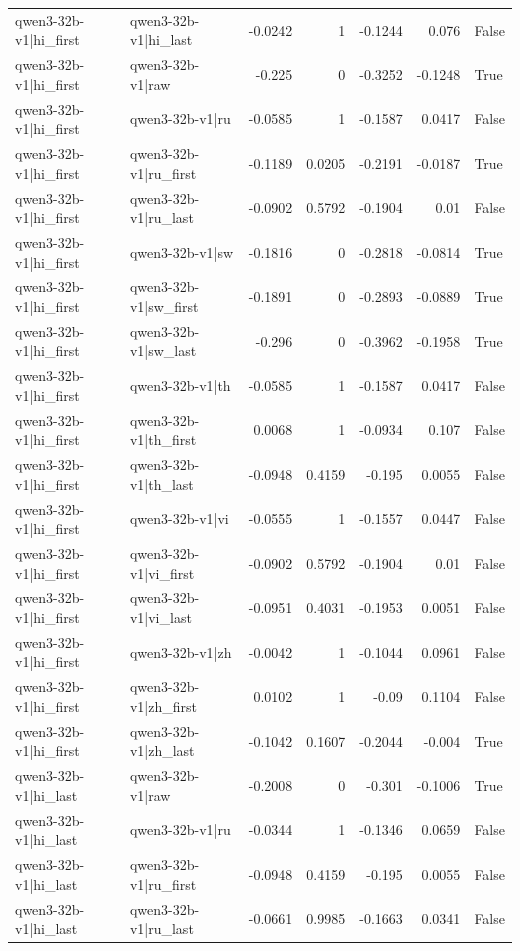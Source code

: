 \begin{table}
\begin{tabular}{l l r r r r l}
qwen3-32b-v1|hi_first & qwen3-32b-v1|hi_last & -0.0242 & 1 & -0.1244 & 0.076 & False \\
qwen3-32b-v1|hi_first & qwen3-32b-v1|raw & -0.225 & 0 & -0.3252 & -0.1248 & True \\
qwen3-32b-v1|hi_first & qwen3-32b-v1|ru & -0.0585 & 1 & -0.1587 & 0.0417 & False \\
qwen3-32b-v1|hi_first & qwen3-32b-v1|ru_first & -0.1189 & 0.0205 & -0.2191 & -0.0187 & True \\
qwen3-32b-v1|hi_first & qwen3-32b-v1|ru_last & -0.0902 & 0.5792 & -0.1904 & 0.01 & False \\
qwen3-32b-v1|hi_first & qwen3-32b-v1|sw & -0.1816 & 0 & -0.2818 & -0.0814 & True \\
qwen3-32b-v1|hi_first & qwen3-32b-v1|sw_first & -0.1891 & 0 & -0.2893 & -0.0889 & True \\
qwen3-32b-v1|hi_first & qwen3-32b-v1|sw_last & -0.296 & 0 & -0.3962 & -0.1958 & True \\
qwen3-32b-v1|hi_first & qwen3-32b-v1|th & -0.0585 & 1 & -0.1587 & 0.0417 & False \\
qwen3-32b-v1|hi_first & qwen3-32b-v1|th_first & 0.0068 & 1 & -0.0934 & 0.107 & False \\
qwen3-32b-v1|hi_first & qwen3-32b-v1|th_last & -0.0948 & 0.4159 & -0.195 & 0.0055 & False \\
qwen3-32b-v1|hi_first & qwen3-32b-v1|vi & -0.0555 & 1 & -0.1557 & 0.0447 & False \\
qwen3-32b-v1|hi_first & qwen3-32b-v1|vi_first & -0.0902 & 0.5792 & -0.1904 & 0.01 & False \\
qwen3-32b-v1|hi_first & qwen3-32b-v1|vi_last & -0.0951 & 0.4031 & -0.1953 & 0.0051 & False \\
qwen3-32b-v1|hi_first & qwen3-32b-v1|zh & -0.0042 & 1 & -0.1044 & 0.0961 & False \\
qwen3-32b-v1|hi_first & qwen3-32b-v1|zh_first & 0.0102 & 1 & -0.09 & 0.1104 & False \\
qwen3-32b-v1|hi_first & qwen3-32b-v1|zh_last & -0.1042 & 0.1607 & -0.2044 & -0.004 & True \\
qwen3-32b-v1|hi_last & qwen3-32b-v1|raw & -0.2008 & 0 & -0.301 & -0.1006 & True \\
qwen3-32b-v1|hi_last & qwen3-32b-v1|ru & -0.0344 & 1 & -0.1346 & 0.0659 & False \\
qwen3-32b-v1|hi_last & qwen3-32b-v1|ru_first & -0.0948 & 0.4159 & -0.195 & 0.0055 & False \\
qwen3-32b-v1|hi_last & qwen3-32b-v1|ru_last & -0.0661 & 0.9985 & -0.1663 & 0.0341 & False \\

\end{tabular}
\end{table}
